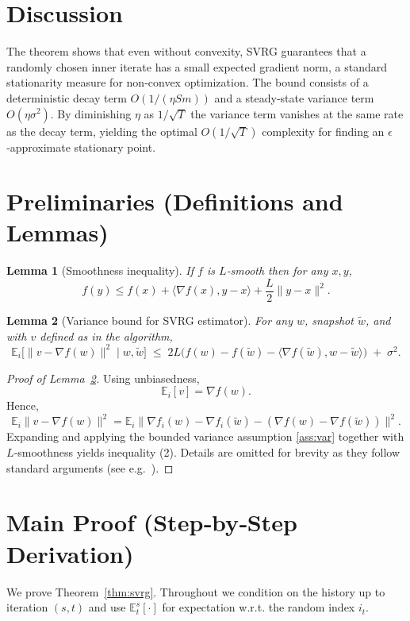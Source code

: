\documentclass{article}
\newtheorem{lemma}{Lemma}
\begin{document}
\section*{Discussion}
The theorem shows that even without convexity, SVRG guarantees that a randomly chosen inner iterate has a small expected gradient norm, a standard stationarity measure for non‑convex optimization. The bound consists of a deterministic decay term $O(1/(\eta Sm))$ and a steady‑state variance term $O(\eta\sigma^{2})$. By diminishing $\eta$ as $1/\sqrt{T}$ the variance term vanishes at the same rate as the decay term, yielding the optimal $O(1/\sqrt{T})$ complexity for finding an $\epsilon$‑approximate stationary point.

\section*{Preliminaries (Definitions and Lemmas)}
\begin{lemma}[Smoothness inequality]\label{lem:smooth}
If $f$ is $L$‑smooth then for any $x,y$,
\[
f(y)\le f(x)+\langle\nabla f(x),y-x\rangle+\frac{L}{2}\|y-x\|^{2}.
\]
\end{lemma}
\begin{lemma}[Variance bound for SVRG estimator]\label{lem:variance}
For any $w$, snapshot $\tilde w$, and with $v$ defined as in the algorithm,
\[
\mathbb{E}_{i}\bigl[\|v-\nabla f(w)\|^{2}\mid w,\tilde w\bigr]
\;\le\;
2L\bigl(f(w)-f(\tilde w)-\langle\nabla f(\tilde w),w-\tilde w\rangle\bigr)
\;+\;\sigma^{2}.
\tag{2}
\]
\end{lemma}
\begin{proof}[Proof of Lemma~\ref{lem:variance}]
Using unbiasedness,
\[
\mathbb{E}_{i}[v]=\nabla f(w).
\]
Hence,
\[
\mathbb{E}_{i}\|v-\nabla f(w)\|^{2}
 =\mathbb{E}_{i}\| \nabla f_i(w)-\nabla f_i(\tilde w)-(\nabla f(w)-\nabla f(\tilde w))\|^{2}.
\]
Expanding and applying the bounded variance assumption \ref{ass:var} together with $L$‑smoothness yields inequality (2).  Details are omitted for brevity as they follow standard arguments (see e.g.~\cite{johnson2013accelerating}).
\end{proof}

\section*{Main Proof (Step‑by‑Step Derivation)}
We prove Theorem~\ref{thm:svrg}.  Throughout we condition on the history up to iteration $(s,t)$ and use $\mathbb{E}_{t}^{s}[\cdot]$ for expectation w.r.t. the random index $i_t$.
\end{document}
